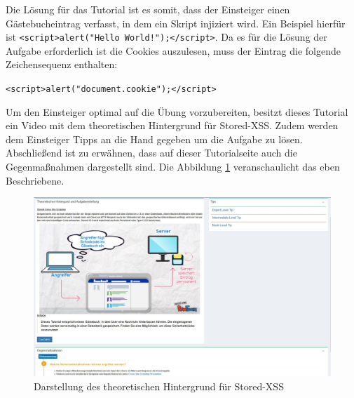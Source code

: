 Die Lösung für das Tutorial ist es somit, dass der Einsteiger einen Gästebucheintrag verfasst, in dem ein Skript injiziert wird. Ein Beispiel hierfür ist \colorbox{altgray}{\lstinline|<script>alert("Hello World!");</script>|}. Da es für die Lösung der Aufgabe erforderlich ist die Cookies auszulesen, muss der Eintrag die folgende Zeichensequenz enthalten: 
\begin{center} 
\colorbox{altgray}{\lstinline|<script>alert("document.cookie");</script>|} 
\end{center}

Um den Einsteiger optimal auf die Übung vorzubereiten, besitzt dieses Tutorial ein Video mit dem theoretischen Hintergrund für Stored-XSS. Zudem werden dem Einsteiger Tipps an die Hand gegeben um die Aufgabe zu lösen. Abschließend ist zu erwähnen, dass auf dieser Tutorialseite auch die Gegenmaßnahmen dargestellt sind. Die Abbildung \ref{fig:stored-xss-theorie} veranschaulicht das eben Beschriebene. 

\begin{figure}[H]
	\centering
	\includegraphics[width=\textwidth]{images/XSS/stored-xss-theorie.jpg}
	\caption{Darstellung des theoretischen Hintergrund für Stored-XSS}
	\label{fig:stored-xss-theorie}
\end{figure}

